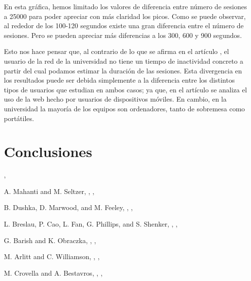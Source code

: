 \documentclass[twocolumn]{Jornadas}
\begin{document}
En esta gráfica, hemos limitado los valores de diferencia entre número de sesiones a 25000 para poder apreciar con más claridad los picos. Como se puede observar, al rededor de los 100-120 segundos existe una gran diferencia entre el número de sesiones. Pero se pueden apreciar más diferencias a los 300, 600 y 900 segundos.

Esto nos hace pensar que, al contrario de lo que se afirma en el artículo \cite{}, el usuario de la red de la universidad no tiene un tiempo de inactividad concreto a partir del cual podamos estimar la duración de las sesiones. Esta divergencia en los resultados puede ser debida simplemente a la diferencia entre los distintos tipos de usuarios que estudian en ambos casos; ya que, en el artículo \cite{} se analiza el uso de la web hecho por usuarios de dispositivos móviles. En cambio, en la universidad la mayoría de los equipos son ordenadores, tanto de sobremesa como portátiles.

\section{Conclusiones}
\label{conclusiones}



\nocite{*}


\begin{thebibliography}{1}


,

A. Mahanti and M. Seltzer,
,
,

B. Dushka, D. Marwood, and M. Feeley,
,
,

L. Breslau, P. Cao, L. Fan, G. Phillips, and S. Shenker,
,
,

G. Barish and K. Obraczka,
,
,

M. Arlitt and C. Williamson,
,
,

M. Crovella and A. Bestavros,
,
,

\end{thebibliography}
\end{document}

